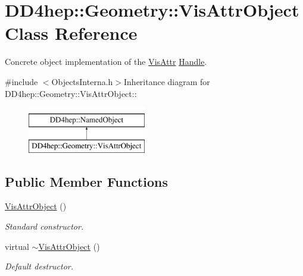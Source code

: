 \hypertarget{class_d_d4hep_1_1_geometry_1_1_vis_attr_object}{
\section{DD4hep::Geometry::VisAttrObject Class Reference}
\label{class_d_d4hep_1_1_geometry_1_1_vis_attr_object}
}


Concrete object implementation of the \hyperlink{class_d_d4hep_1_1_geometry_1_1_vis_attr}{VisAttr} \hyperlink{class_d_d4hep_1_1_handle}{Handle}.  


{\ttfamily \#include $<$ObjectsInterna.h$>$}Inheritance diagram for DD4hep::Geometry::VisAttrObject::\begin{figure}[H]
\begin{center}
\leavevmode
\includegraphics[height=2cm]{class_d_d4hep_1_1_geometry_1_1_vis_attr_object}
\end{center}
\end{figure}
\subsection*{Public Member Functions}
\begin{DoxyCompactItemize}
\item 
\hyperlink{class_d_d4hep_1_1_geometry_1_1_vis_attr_object_ae88bf67cabcbfd4582037897a05f25bb}{VisAttrObject} ()
\begin{DoxyCompactList}\small\item\em Standard constructor. \item\end{DoxyCompactList}\item 
virtual \hyperlink{class_d_d4hep_1_1_geometry_1_1_vis_attr_object_afd52e626a97e4ddcfb911f16fcef517b}{$\sim$VisAttrObject} ()
\begin{DoxyCompactList}\small\item\em Default destructor. \item\end{DoxyCompactList}\end{DoxyCompactItemize}
